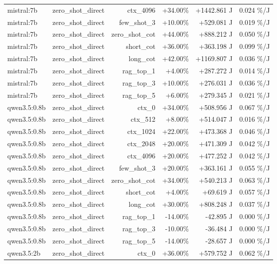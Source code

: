 \begin{table}[t]
\begin{tabular}{lrrrrr}
mistral:7b & zero\_shot\_direct & ctx\_4096 & +34.00\% & +1442.861 J & 0.024 \%/J \\
mistral:7b & zero\_shot\_direct & few\_shot\_3 & +10.00\% & +529.081 J & 0.019 \%/J \\
mistral:7b & zero\_shot\_direct & zero\_shot\_cot & +44.00\% & +888.212 J & 0.050 \%/J \\
mistral:7b & zero\_shot\_direct & short\_cot & +36.00\% & +363.198 J & 0.099 \%/J \\
mistral:7b & zero\_shot\_direct & long\_cot & +42.00\% & +1169.807 J & 0.036 \%/J \\
mistral:7b & zero\_shot\_direct & rag\_top\_1 & +4.00\% & +287.272 J & 0.014 \%/J \\
mistral:7b & zero\_shot\_direct & rag\_top\_3 & +10.00\% & +276.031 J & 0.036 \%/J \\
mistral:7b & zero\_shot\_direct & rag\_top\_5 & +6.00\% & +279.345 J & 0.021 \%/J \\
qwen3.5:0.8b & zero\_shot\_direct & ctx\_0 & +34.00\% & +508.956 J & 0.067 \%/J \\
qwen3.5:0.8b & zero\_shot\_direct & ctx\_512 & +8.00\% & +514.047 J & 0.016 \%/J \\
qwen3.5:0.8b & zero\_shot\_direct & ctx\_1024 & +22.00\% & +473.368 J & 0.046 \%/J \\
qwen3.5:0.8b & zero\_shot\_direct & ctx\_2048 & +20.00\% & +471.309 J & 0.042 \%/J \\
qwen3.5:0.8b & zero\_shot\_direct & ctx\_4096 & +20.00\% & +477.252 J & 0.042 \%/J \\
qwen3.5:0.8b & zero\_shot\_direct & few\_shot\_3 & +20.00\% & +363.161 J & 0.055 \%/J \\
qwen3.5:0.8b & zero\_shot\_direct & zero\_shot\_cot & +34.00\% & +540.213 J & 0.063 \%/J \\
qwen3.5:0.8b & zero\_shot\_direct & short\_cot & +4.00\% & +69.619 J & 0.057 \%/J \\
qwen3.5:0.8b & zero\_shot\_direct & long\_cot & +30.00\% & +808.248 J & 0.037 \%/J \\
qwen3.5:0.8b & zero\_shot\_direct & rag\_top\_1 & -14.00\% & -42.895 J & 0.000 \%/J \\
qwen3.5:0.8b & zero\_shot\_direct & rag\_top\_3 & -10.00\% & -36.484 J & 0.000 \%/J \\
qwen3.5:0.8b & zero\_shot\_direct & rag\_top\_5 & -14.00\% & -28.657 J & 0.000 \%/J \\
qwen3.5:2b & zero\_shot\_direct & ctx\_0 & +36.00\% & +579.752 J & 0.062 \%/J \\

\end{tabular}
\end{table}
